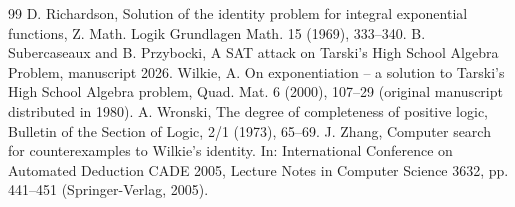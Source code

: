 \documentclass[eqnor,reqno]{amsart}
\theoremstyle{plain}
\theoremstyle{definition}
\begin{document}
\begin{thebibliography}{99}
 D. Richardson,  Solution of the identity problem for integral exponential functions, Z. Math. Logik Grundlagen Math. 15 (1969), 333--340.
 B. Subercaseaux and B. Przybocki, A SAT attack on Tarski’s High School Algebra Problem, manuscript 2026.
 Wilkie, A. On exponentiation -- a solution to Tarski's
High School Algebra problem, Quad. Mat.  6 (2000), 107--29 (original manuscript distributed in 1980).
 A. Wronski, The degree of completeness of positive logic, Bulletin of the Section of Logic, 2/1 (1973),
65--69.
 J. Zhang, Computer search for counterexamples to Wilkie’s identity. In: International Conference on Automated Deduction CADE 2005, Lecture Notes in Computer Science 3632,
pp. 441--451 (Springer-Verlag, 2005).
\end{thebibliography}
\end{document}
